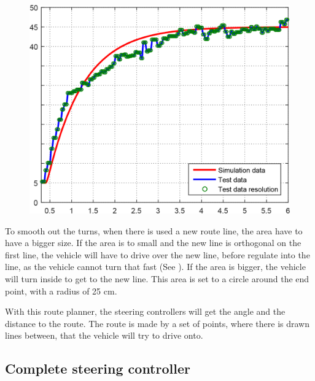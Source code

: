 \begin{figure}[H]
 	\centering
 	\includegraphics[scale=0.25]{figures/SteeringAngularTest.png}
 	\caption{ }
 	\label{fig:RCfig3}
\end{figure}

To smooth out the turns, when there is used a new route line, the area have to have a bigger size. If the area is to small and the new line is orthogonal on the first line, the vehicle will have to drive over the new line, before regulate into the line, as the vehicle cannot turn that fast (See ). If the area is bigger, the vehicle will turn inside to get to the new line. This area is set to a circle around the end point, with a radius of 25 cm. 

With this route planner, the steering controllers will get the angle and the distance to the route. The route is made by a set of points, where there is drawn lines between, that the vehicle will try to drive onto.

\subsection{Complete steering controller}

